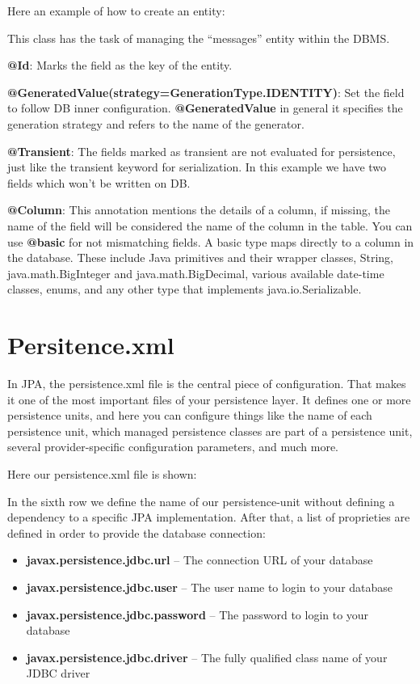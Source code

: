 \documentclass[a4paper]{article}
\begin{document}
Here an example of how to create an entity:

This class has the task of managing the “messages” entity within the DBMS.

\textbf{@Id}: Marks the field as the key of the entity.

\textbf{@GeneratedValue(strategy=GenerationType.IDENTITY)}: Set the field to follow DB inner configuration.
\textbf{@GeneratedValue} in general it specifies the generation strategy and refers to the name of the generator.

\textbf{@Transient}: The fields marked as transient are not evaluated for persistence, just like the transient
keyword for serialization. In this example we have two fields which won’t be  written on DB.

\textbf{@Column}: This annotation mentions the details of a column, if missing, the name of the field will be considered the name of the column in the table.
You can use \textbf{@basic} for not mismatching fields. A basic type maps directly to a column in the database. These include Java primitives and their wrapper classes, String, java.math.BigInteger and java.math.BigDecimal, various available date-time classes, enums, and any other type that implements java.io.Serializable.

\section{Persitence.xml}
In JPA, the persistence.xml file is the central piece of configuration. That makes it one of the most important files of your persistence layer. It defines one or more persistence units, and here you can configure things like the name of each persistence unit, which managed persistence classes are part of a persistence unit, several provider-specific configuration parameters, and much more.

Here our persistence.xml file is shown:

In the sixth row we define the name of our persistence-unit without defining a dependency to a specific JPA implementation. After that, a list of proprieties are defined in order to provide the database connection:

\begin{itemize}
\item\textbf{javax.persistence.jdbc.url} – The connection URL of your database
\item\textbf{javax.persistence.jdbc.user} – The user name to login to your database
\item\textbf{javax.persistence.jdbc.password} – The password to login to your database
\item\textbf{javax.persistence.jdbc.driver} – The fully qualified class name of your JDBC driver
\end{itemize}
\end{document}
